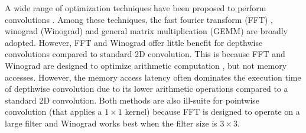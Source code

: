 A wide range of optimization techniques have been proposed to perform convolutions
\cite{li2016optimizing,Zhen2018Optimizing,enfedaque2014implementation,liu2019optimizing,winter2019adaptive,vasilache2014fast,lavin2016fast,Vasudevan2017Parallel,Chellapilla2006High}.
Among these techniques, the fast fourier transform (FFT) \cite{vasilache2014fast}, winograd (Winograd) \cite{lavin2016fast} and general
matrix multiplication (GEMM) \cite{Vasudevan2017Parallel,Chellapilla2006High} are broadly adopted. However, FFT and Winograd offer little
benefit for depthwise convolutions compared to standard 2D convolution. This is because FFT and Winograd are designed to optimize
arithmetic computation \cite{zlateski2019anatomy}, but not memory accesses. However, the memory access latency often dominates the execution time of
depthwise convolution \cite{cudaperformance} due to its lower arithmetic operations compared to a standard 2D convolution.  Both methods
are also ill-suite for pointwise convolution (that applies a $1 \times 1$ kernel) because FFT is designed to operate on a large filter and
Winograd works best when the filter size is $3 \times 3$.



